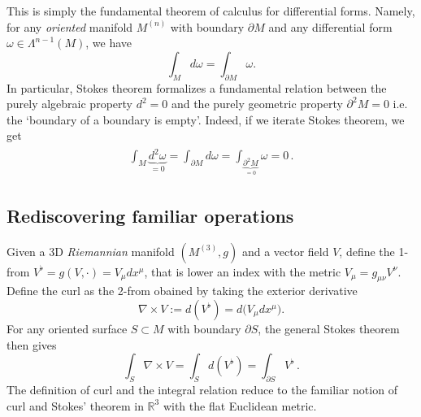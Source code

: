 \documentclass[../geometry_main.tex]{subfiles}
\begin{document}
\begin{mytheorem}
This is simply the fundamental theorem of calculus for differential forms.
Namely, for any \emph{oriented} manifold $M^{(n)}$ with boundary $\partial M$ and any differential form $\omega \in \Lambda^{n-1} (M)$, we have
\begin{equation}
    \int_M d\omega = \int_{\partial M} \omega.
\end{equation}
In particular, Stokes theorem formalizes a fundamental relation between the purely algebraic property $d^2 = 0$ and the purely geometric property $\partial ^2 M =0$ i.e. the `boundary of a boundary is empty'.
Indeed, if we iterate Stokes theorem, we get
{\small\begin{align}
\begin{aligned}
    \int_M \underbrace{d^2\!\omega}_{=0}=\int_{\partial M} d\omega = \int_{\underbrace{\partial^2 M}_{=0}} \omega = 0\,.
\end{aligned}
\end{align}}

\end{mytheorem}


\subsection{Rediscovering familiar operations}

\begin{mytheorem}
Given a 3D \emph{Riemannian} manifold $(M^{(3)},g)$ and a vector field $V$, define the 1-from $V^\flat=g(V,\cdot)= V_\mu dx^{\mu}$, that is lower an index with the metric $V_\mu=g_{\mu \nu} V^{\nu}$.
Define the curl as the 2-from obained by taking the exterior derivative
\begin{equation}
    \nabla\times V := d (V^\flat) = d \big(V_{\mu} dx^{\mu}\big).
\end{equation}
For any oriented surface $S\subset M$ with boundary $\partial S$, the general Stokes theorem then gives
\begin{equation}
    \int_S \nabla\times V =\int_S d (V^\flat) = \int_{\partial S} V^\flat\,.
\end{equation}
The definition of curl and the integral relation reduce to the familiar notion of curl and Stokes' theorem in $\mathbb{R}^3$ with the flat Euclidean metric.
\end{mytheorem}
\end{document}
